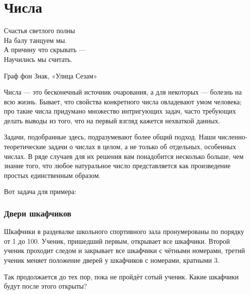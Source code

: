 \chapter*{Числа}

\setlength{\epigraphwidth}{.4\textwidth}
\epigraph{Счастья светлого полны\\ %
На балу танцуем мы.\\ %
А причину что скрывать ---\\ %
Научились мы считать.}{Граф фон Знак, «Улица Сезам»}


 

Числа --- это бесконечный источник очарования, а для некоторых --- болезнь на всю жизнь. %
Бывает, что свойства конкретного числа овладевают умом человека;
про такие числа придумано множество интригующих задач,
часто требующих делать выводы из того, что на первый взгляд кажется нехваткой данных.

Задачи, подобранные здесь, подразумевают %
более общий подход. %
Наши численно-теоретические задачи о числах в целом, а не только об отдельных, особенных числах.
В ряде случаев для их решения вам понадобится несколько больше, чем знание того, 
что любое натуральное число представляется как произведение простых единственным образом.

\medskip

Вот задача для примера:

\subsection*{Двери шкафчиков}%

Шкафчики в раздевалке школьного спортивного зала пронумерованы по порядку от 1 до 100.
Ученик, пришедший первым, открывает все шкафчики.
Второй ученик проходит следом и закрывает все шкафчики с чётными номерами, третий ученик меняет положение дверей у шкафчиков с номерами, кратными 3.

Так продолжается до тех пор, пока не пройдёт сотый ученик.
Какие шкафчики будут после этого открыты?
 
